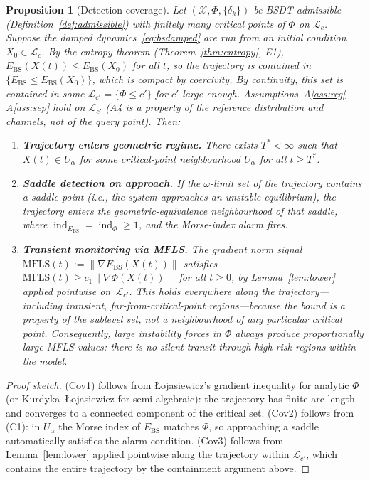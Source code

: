 \documentclass[11pt,a4paper]{article}
\newcommand{\Ebs}{E_{\mathrm{BS}}}
\newcommand{\grad}{\nabla}
\DeclareMathOperator{\ind}{ind}
\newtheorem{proposition}[theorem]{Proposition}
\begin{document}
\begin{proposition}[Detection coverage]\label{prop:coverage}
Let $(\mathcal{X}, \Phi, \{\delta_k\})$ be BSDT-admissible
(Definition~\ref{def:admissible}) with finitely many critical
points of $\Phi$ on $\mathcal{L}_c$.  Suppose the damped
dynamics~\eqref{eq:bsdamped} are run from an initial condition
$X_0 \in \mathcal{L}_c$.  By the entropy theorem
(Theorem~\ref{thm:entropy}, E1), $\Ebs(X(t)) \le \Ebs(X_0)$
for all $t$, so the trajectory is contained in
$\{\Ebs \le \Ebs(X_0)\}$, which is compact by coercivity.
By continuity, this set is contained in some
$\mathcal{L}_{c'} = \{\Phi \le c'\}$ for $c'$ large enough.
Assumptions~A\ref{ass:reg}--A\ref{ass:sep} hold on
$\mathcal{L}_{c'}$ (A4 is a property of the reference
distribution and channels, not of the query point).  Then:
\begin{enumerate}[nosep]
  \item[\textup{(Cov1)}] \textbf{Trajectory enters geometric
    regime.}  There exists $T^* < \infty$ such that $X(t) \in
    U_\alpha$ for some critical-point neighbourhood $U_\alpha$
    for all $t \ge T^*$.
  \item[\textup{(Cov2)}] \textbf{Saddle detection on approach.}
    If the $\omega$-limit set of the trajectory contains a saddle
    point (i.e., the system approaches an unstable equilibrium),
    the trajectory enters the geometric-equivalence neighbourhood
    of that saddle, where $\ind_{\Ebs} = \ind_\Phi \ge 1$, and
    the Morse-index alarm fires.
  \item[\textup{(Cov3)}] \textbf{Transient monitoring via MFLS.}
    The gradient norm signal
    $\mathrm{MFLS}(t) := \|\grad\Ebs(X(t))\|$ satisfies
    $\mathrm{MFLS}(t) \ge c_1\|\grad\Phi(X(t))\|$ for all
    $t \ge 0$, by Lemma~\ref{lem:lower} applied pointwise
    on~$\mathcal{L}_{c'}$.  This holds \emph{everywhere} along
    the trajectory---including transient, far-from-critical-point
    regions---because the bound is a property of the sublevel set,
    not a neighbourhood of any particular critical point.
    Consequently, large instability forces in $\Phi$ always
    produce proportionally large MFLS values: there is no
    silent transit through high-risk regions within the model.
\end{enumerate}
\end{proposition}

\begin{proof}[Proof sketch]
(Cov1) follows from \L{}ojasiewicz's gradient inequality for
analytic $\Phi$ (or Kurdyka--\L{}ojasiewicz for semi-algebraic):
the trajectory has finite arc length and converges to a connected
component of the critical set.
(Cov2) follows from (C1): in $U_\alpha$ the Morse index of
$\Ebs$ matches $\Phi$, so approaching a saddle automatically
satisfies the alarm condition.
(Cov3) follows from Lemma~\ref{lem:lower} applied pointwise
along the trajectory within $\mathcal{L}_{c'}$, which contains
the entire trajectory by the containment argument above.
\end{proof}
\end{document}
